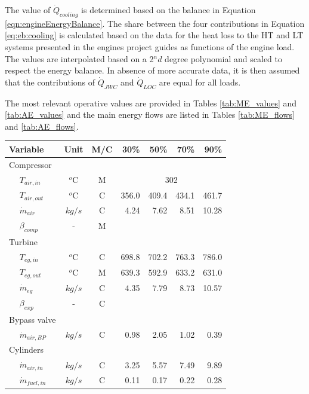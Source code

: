 \documentclass[preprint,12pt]{elsarticle}
\begin{document}
The value of $\dot{Q}_{cooling}$ is determined based on the balance in Equation \ref{eqn:engineEnergyBalance}. The share between the four contributions in Equation \ref{eq:eb:cooling} is calculated based on the data for the heat loss to the HT and LT systems presented in the engines project guides as functions of the engine load. The values are interpolated based on a 2$^nd$ degree polynomial and scaled to respect the energy balance. In absence of more accurate data, it is then assumed that the contributions of $\dot{Q}_{JWC}$ and $\dot{Q}_{LOC}$ are equal for all loads. 

The most relevant operative values are provided in Tables \ref{tab:ME_values} and \ref{tab:AE_values} and the main energy flows are listed in Tables \ref{tab:ME_flows} and \ref{tab:AE_flows}. 


\begin{table}
	\small
	\centering
	\begin{tabular}{llccrrrr}
		\toprule
		\multicolumn{2}{l}{Variable} & Unit & M/C & 30\% & 50\% & 70\% & 90\% \\
		\midrule
		\multicolumn{2}{l}{Compressor} & & & & & & \\ 
		& 	$T_{air,in}$  		& $^o$C & M & \multicolumn{4}{c}{302} \\ 
		&	$T_{air,out}$  		& $^o$C & C  & 356.0 & 409.4 & 434.1 & 461.7 \\ 
		&	$\dot{m}_{air}$  	& $kg/s$ & C  & 4.24 & 7.62 & 8.51 & 10.28 \\
		&   $\beta_{comp}$		& - 	& M & & & &  \\
		\multicolumn{2}{l}{Turbine} & & & & & &  \\
		&	$T_{eg,in}$   		& $^o$C & C  & 698.8 & 702.2 & 763.3 & 786.0 \\ 
		&	$T_{eg,out}$  		& $^o$C & M  & 639.3 & 592.9 & 633.2 & 631.0 \\ 
		&	$\dot{m}_{eg}$  	& $kg/s$ & C  & 4.35 & 7.79 & 8.73 & 10.57 \\
		&   $\beta_{exp}$		& - 	& C & & & &  \\
		\multicolumn{2}{l}{Bypass valve} & & & & & &  \\
		&	$\dot{m}_{air,BP}$	& $kg/s$ & C  & 0.98 & 2.05 & 1.02 & 0.39 \\  
		\multicolumn{2}{l}{Cylinders} & & & & & &   \\
		&	$\dot{m}_{air,in}$  & $kg/s$ & C  & 3.25 & 5.57 & 7.49 & 9.89 \\
		&	$\dot{m}_{fuel,in}$ & $kg/s$ & C  & 0.11 & 0.17 & 0.22 & 0.28 \\ 

\end{tabular}
\end{table}
\end{document}

